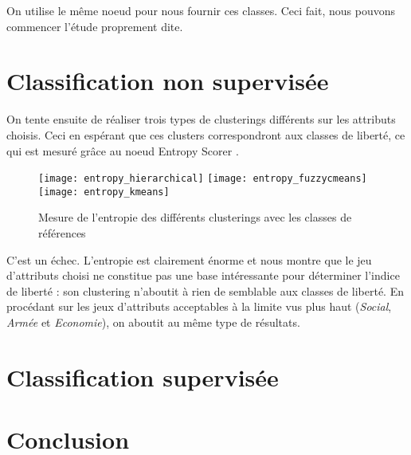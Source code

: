 On utilise le même noeud pour nous fournir ces classes. Ceci fait, nous pouvons commencer l'étude proprement dite.

\section{Classification non supervisée}
On tente ensuite de réaliser trois types de clusterings différents sur les attributs choisis. Ceci en espérant que ces clusters correspondront aux classes de liberté, ce qui est mesuré grâce au noeud \og Entropy Scorer \fg.
\begin{figure}[H]
	\centering
	\texttt{[image: entropy\_hierarchical]}
	\texttt{[image: entropy\_fuzzycmeans]}
	\texttt{[image: entropy\_kmeans]}
	\caption{Mesure de l'entropie des différents clusterings avec les classes de références}
\end{figure}
C'est un échec. L'entropie est clairement énorme et nous montre que le jeu d'attributs choisi ne constitue pas une base intéressante pour déterminer l'indice de liberté : son clustering n'aboutit à rien de semblable aux classes de liberté. En procédant sur les jeux d'attributs \og acceptables à la limite \fg vus plus haut (\emph{Social}, \emph{Armée} et \emph{Economie}), on aboutit au même type de résultats.

\section{Classification supervisée}






\section{Conclusion}


